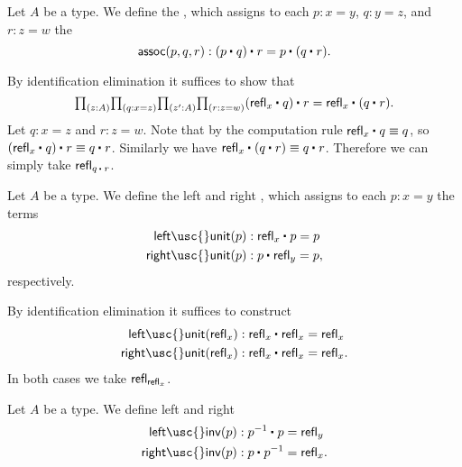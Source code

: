 \begin{defn}\label{defn:id_assoc}
Let $A$ be a type. We define the , which assigns to each $p:x=y$, $q:y=z$, and $r:z=w$ the 
\begin{equation*}
\mathsf{assoc}(p,q,r) : \ct{(\ct{p}{q})}{r}=\ct{p}{(\ct{q}{r})}.
\end{equation*}
\end{defn}

\begin{constr}
By identification elimination it suffices to show that
\begin{equation*}
\prd{z:A}{q:x=z}{z':A}{r:z=w} \ct{(\ct{\refl{x}}{q})}{r}= \ct{\refl{x}}{(\ct{q}{r})}.
\end{equation*}
Let $q:x=z$ and $r:z=w$. Note that by the computation rule $\ct{\refl{x}}{q}\jdeq q$, so $\ct{(\ct{\refl{x}}{q})}{r}\jdeq \ct{q}{r}$. Similarly we have $\ct{\refl{x}}{(\ct{q}{r})}\jdeq \ct{q}{r}$. Therefore we can simply take $\refl{\ct{q}{r}}$.
\end{constr}

\begin{defn}\label{defn:id_unit}
Let $A$ be a type. We define the left and right , which assigns to each $p:x=y$ the terms
\begin{align*}
\mathsf{left\usc{}unit}(p) & : \ct{\refl{x}}{p}=p \\
\mathsf{right\usc{}unit}(p) & : \ct{p}{\refl{y}}=p,
\end{align*}
respectively.
\end{defn}

\begin{constr}
By identification elimination it suffices to construct
\begin{align*}
\mathsf{left\usc{}unit}(\refl{x}) & : \ct{\refl{x}}{\refl{x}} = \refl{x} \\
\mathsf{right\usc{}unit}(\refl{x}) & : \ct{\refl{x}}{\refl{x}} = \refl{x}.
\end{align*}
In both cases we take $\mathsf{refl}_{\mathsf{refl}_{x}}$.
\end{constr}

\begin{defn}\label{defn:id_invlaw}
Let $A$ be a type. We define left and right 
\begin{align*}
\mathsf{left\usc{}inv}(p) & : \ct{p^{-1}}{p} = \refl{y} \\
\mathsf{right\usc{}inv}(p) & : \ct{p}{p^{-1}} = \refl{x}.
\end{align*}
\end{defn}

